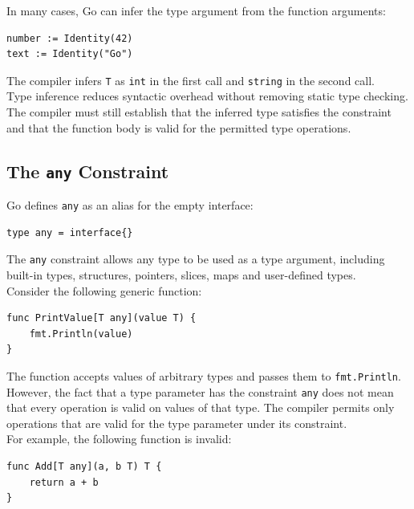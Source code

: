 In many cases, Go can infer the type argument from the function arguments:

\begin{lstlisting}
number := Identity(42)
text := Identity("Go")
\end{lstlisting}

The compiler infers \texttt{T} as \texttt{int} in the first call and \texttt{string} in the second call.\\

Type inference reduces syntactic overhead without removing static type checking. The compiler must still establish that the inferred type satisfies the constraint and that the function body is valid for the permitted type operations.\\

\subsection{The \texttt{any} Constraint}

Go defines \texttt{any} as an alias for the empty interface:

\begin{lstlisting}
type any = interface{}
\end{lstlisting}

The \texttt{any} constraint allows any type to be used as a type argument, including built-in types, structures, pointers, slices, maps and user-defined types.\\

Consider the following generic function:

\begin{lstlisting}
func PrintValue[T any](value T) {
    fmt.Println(value)
}
\end{lstlisting}

The function accepts values of arbitrary types and passes them to \texttt{fmt.Println}.\\

However, the fact that a type parameter has the constraint \texttt{any} does not mean that every operation is valid on values of that type. The compiler permits only operations that are valid for the type parameter under its constraint.\\

For example, the following function is invalid:

\begin{lstlisting}
func Add[T any](a, b T) T {
    return a + b
}
\end{lstlisting}


